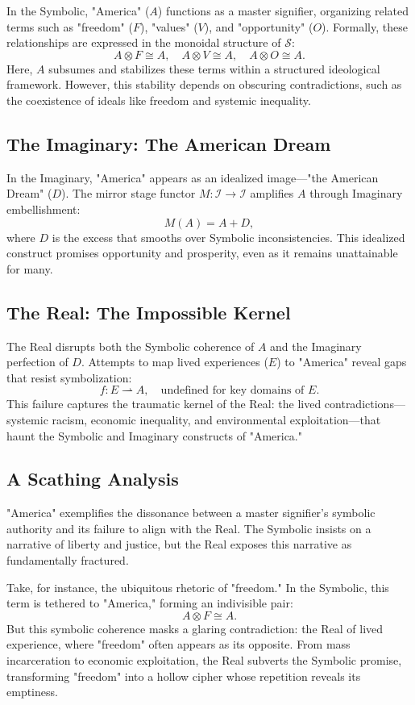 \documentclass{article}
\begin{document}
In the Symbolic, "America" ($A$) functions as a master signifier, organizing related terms such as "freedom" ($F$), "values" ($V$), and "opportunity" ($O$). Formally, these relationships are expressed in the monoidal structure of $\mathscr{S}$:
\[
A \otimes F \cong A, \quad A \otimes V \cong A, \quad A \otimes O \cong A.
\]
Here, $A$ subsumes and stabilizes these terms within a structured ideological framework. However, this stability depends on obscuring contradictions, such as the coexistence of ideals like freedom and systemic inequality.

\subsection{The Imaginary: The American Dream}

In the Imaginary, "America" appears as an idealized image—"the American Dream" ($D$). The mirror stage functor $M: \mathscr{I} \to \mathscr{I}$ amplifies $A$ through Imaginary embellishment:
\[
M(A) = A + D,
\]
where $D$ is the excess that smooths over Symbolic inconsistencies. This idealized construct promises opportunity and prosperity, even as it remains unattainable for many.

\subsection{The Real: The Impossible Kernel}

The Real disrupts both the Symbolic coherence of $A$ and the Imaginary perfection of $D$. Attempts to map lived experiences ($E$) to "America" reveal gaps that resist symbolization:
\[
f: E \rightharpoonup A, \quad \text{undefined for key domains of $E$}.
\]
This failure captures the traumatic kernel of the Real: the lived contradictions—systemic racism, economic inequality, and environmental exploitation—that haunt the Symbolic and Imaginary constructs of "America."

\subsection{A Scathing Analysis}

"America" exemplifies the dissonance between a master signifier's symbolic authority and its failure to align with the Real. The Symbolic insists on a narrative of liberty and justice, but the Real exposes this narrative as fundamentally fractured.

Take, for instance, the ubiquitous rhetoric of "freedom." In the Symbolic, this term is tethered to "America," forming an indivisible pair:
\[
A \otimes F \cong A.
\]
But this symbolic coherence masks a glaring contradiction: the Real of lived experience, where "freedom" often appears as its opposite. From mass incarceration to economic exploitation, the Real subverts the Symbolic promise, transforming "freedom" into a hollow cipher whose repetition reveals its emptiness.
\end{document}
